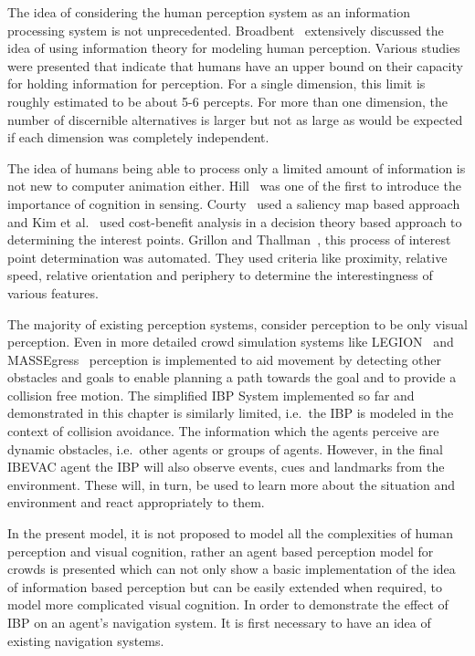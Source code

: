 The idea of considering the human perception system as an information processing system is not unprecedented. Broadbent~\cite{Broadbent:1965is} extensively discussed the idea of using information theory for modeling human perception. Various studies were presented that indicate that humans have an upper bound on their capacity for holding information for perception. For a single dimension, this limit is roughly estimated to be about 5-6 percepts. For more than one dimension, the number of discernible alternatives is larger but not as large as would be expected if each dimension was completely independent. 

The idea of humans being able to process only a limited amount of information is not new to computer animation either. Hill~\cite{Hill:1999ww} was one of the first to introduce the importance of cognition in sensing. Courty~\cite{Courty:2003hy} used a saliency map based approach and Kim et al.~\cite{Kim:2005ub} used cost-benefit analysis in a decision theory based approach to determining the interest points. Grillon and Thallman~\cite{Grillon:2009hf}, this process of interest point determination was automated. They used criteria like proximity, relative speed, relative orientation and periphery to determine the interestingness of various features. 

The majority of existing perception systems, consider perception to be only visual perception. Even in more detailed crowd simulation systems like LEGION~\cite{Still:2000tp} and MASSEgress~\cite{Pan:2006vp} perception is implemented to aid movement by detecting other obstacles and goals to enable planning a path towards the goal and to provide a collision free motion. The simplified IBP System implemented so far and demonstrated in this chapter is similarly limited, i.e.\ the IBP is modeled in the context of collision avoidance. The information which the agents perceive are dynamic obstacles, i.e.\ other agents or groups of agents. However, in the final IBEVAC agent the IBP will also observe events, cues and landmarks from the environment. These will, in turn, be used to learn more about the situation and environment and react appropriately to them.

In the present model, it is not proposed to model all the complexities of human perception and visual cognition, rather an agent based perception model for crowds is presented which can not only show a basic implementation of the idea of information based perception but can be easily extended when required, to model more complicated visual cognition. In order to demonstrate the effect of IBP on an agent's navigation system. It is first necessary to have an idea of existing navigation systems.

